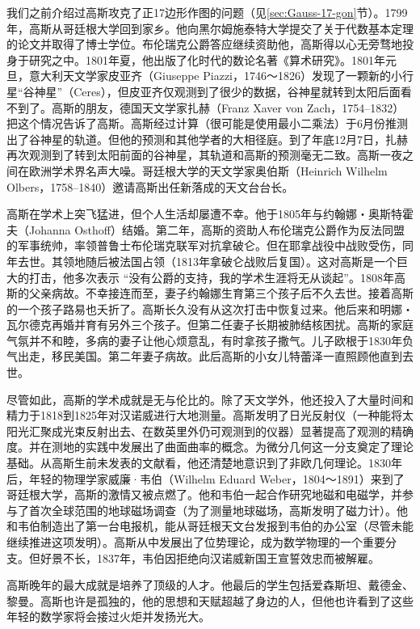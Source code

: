 \documentclass[b5paper]{ctexart}
\begin{document}
\begin{mdframed}
我们之前介绍过高斯攻克了正17边形作图的问题（见\ref{sec:Gauss-17-gon}节）。1799年，高斯从哥廷根大学回到家乡。他向黑尔姆施泰特大学提交了关于代数基本定理的论文并取得了博士学位。布伦瑞克公爵答应继续资助他，高斯得以心无旁骛地投身于研究之中。1801年夏，他出版了化时代的数论名著《算术研究》。1801年元旦，意大利天文学家皮亚齐（Giuseppe Piazzi，1746～1826）发现了一颗新的小行星“谷神星”（Ceres），但皮亚齐仅观测到了很少的数据，谷神星就转到太阳后面看不到了。高斯的朋友，德国天文学家扎赫（Franz Xaver von Zach，1754–1832）把这个情况告诉了高斯。高斯经过计算（很可能是使用最小二乘法）于6月份推测出了谷神星的轨道。但他的预测和其他学者的大相径庭。到了年底12月7日，扎赫再次观测到了转到太阳前面的谷神星，其轨道和高斯的预测毫无二致。高斯一夜之间在欧洲学术界名声大噪。哥廷根大学的天文学家奥伯斯（Heinrich Wilhelm Olbers，1758–1840）邀请高斯出任新落成的天文台台长。

高斯在学术上突飞猛进，但个人生活却屡遭不幸。他于1805年与约翰娜・奥斯特霍夫（Johanna Osthoff）结婚。第二年，高斯的资助人布伦瑞克公爵作为反法同盟的军事统帅，率领普鲁士布伦瑞克联军对抗拿破仑。但在耶拿战役中战败受伤，同年去世。其领地随后被法国占领（1813年拿破仑战败后复国）。这对高斯是一个巨大的打击，他多次表示 “没有公爵的支持，我的学术生涯将无从谈起”。1808年高斯的父亲病故。不幸接连而至，妻子约翰娜生育第三个孩子后不久去世。接着高斯的一个孩子路易也夭折了。高斯长久没有从这次打击中恢复过来。他后来和明娜・瓦尔德克再婚并育有另外三个孩子。但第二任妻子长期被肺结核困扰。高斯的家庭气氛并不和睦，多病的妻子让他心烦意乱，有时拿孩子撒气。儿子欧根于1830年负气出走，移民美国。第二年妻子病故。此后高斯的小女儿特蕾泽一直照顾他直到去世。

尽管如此，高斯的学术成就是无与伦比的。除了天文学外，他还投入了大量时间和精力于1818到1825年对汉诺威进行大地测量。高斯发明了日光反射仪（一种能将太阳光汇聚成光束反射出去、在数英里外仍可观测到的仪器）显著提高了观测的精确度。并在测地的实践中发展出了曲面曲率的概念。为微分几何这一分支奠定了理论基础。从高斯生前未发表的文献看，他还清楚地意识到了非欧几何理论。1830年后，年轻的物理学家威廉·韦伯（Wilhelm Eduard Weber，1804～1891）来到了哥廷根大学，高斯的激情又被点燃了。他和韦伯一起合作研究地磁和电磁学，并参与了首次全球范围的地球磁场调查（为了测量地球磁场，高斯发明了磁力计）。他和韦伯制造出了第一台电报机，能从哥廷根天文台发报到韦伯的办公室（尽管未能继续推进这项发明）。高斯从中发展出了位势理论，成为数学物理的一个重要分支。但好景不长，1837年，韦伯因拒绝向汉诺威新国王宣誓效忠而被解雇。

高斯晚年的最大成就是培养了顶级的人才。他最后的学生包括爱森斯坦、戴德金、黎曼。高斯也许是孤独的，他的思想和天赋超越了身边的人，但他也许看到了这些年轻的数学家将会接过火炬并发扬光大。
\end{mdframed}
\end{document}
